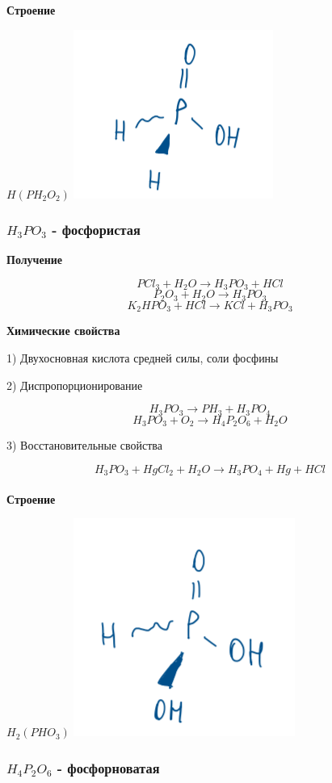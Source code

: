 \textbf{Строение}

$H(PH_2O_2)$
\includegraphics{images/9v8.png}

\subsubsection*{$H_3PO_3$ - фосфористая}

\textbf{Получение}

$$PCl_3 + H_2O \rightarrow H_3PO_3 + HCl$$
$$P_2O_3 + H_2O \rightarrow H_3PO_3$$
$$K_2HPO_3 + HCl \rightarrow KCl + H_3PO_3$$

\textbf{Химические свойства}

1) Двухосновная кислота средней силы, соли фосфины

2) Диспропорционирование

$$H_3PO_3 \rightarrow PH_3 + H_3PO_4$$
$$H_3PO_3 + O_2 \rightarrow H_4P_2O_6 + H_2O$$

3) Восстановительные свойства

$$H_3PO_3 + HgCl_2 + H_2O \rightarrow H_3PO_4 + Hg + HCl$$
\\
\textbf{Строение}

$H_2(PHO_3)$
\includegraphics{images/9v9.png}

\subsubsection*{$H_4P_2O_6$ - фосфорноватая}

